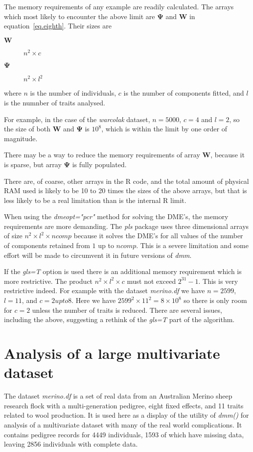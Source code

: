 \documentclass[titlepage]{article}  %
\begin{document}
The memory requirements of any example are readily calculated. The arrays which most likely to encounter the above limit are ${\bm \Psi}$ and ${\bm W}$ in equation~\ref{eq.eighth}. Their sizes are

\begin{description}
\item[${\bm W}$] $n^{2} \times c$
\item[${\bm \Psi}$] $n^{2} \times l^{2}$
\end{description}
 where $n$ is the number of individuals, $c$ is the number of components fitted, and $l$ is the numnber of traits analysed.

For example, in the case of the {\em warcolak} dataset, $n = 5000$, $c = 4$ and $l = 2$, so the size of both ${\bm W}$ and ${\bm \Psi}$ is $10^8$, which is within the limit by one order of magnitude.

There may be a way to reduce the memory requirements of array ${\bm W}$, because it is sparse, but array ${\bm \Psi}$ is fully populated.

There are, of coarse, other arrays in the R code, and the total amount of physical RAM used is likely to be 10 to 20 times the sizes of the above arrays, but that is less likely to be a real limitation than is the internal R limit.

When using the {\em dmeopt="pcr"} method for solving the DME's, the memory requirements are more demanding. The {\em pls} package uses three dimensional arrays of size $n^{2} \times l^{2} \times ncomp$ because it solves the DME's for all values of the number of components retained from $1$ up to $ncomp$. This is a severe limitation and some effort will be made to circumvent it in future versions of {\em dmm}.

If the {\em gls=T} option is used there is an additional memory requirement which is more restrictive. The product $n^{2} \times l^{2} \times c$ must not exceed $2^{31} - 1$. This is very restrictive indeed. For example with the dataset {\em merino.df} we have $n = 2599$, $l = 11$, and $c = 2 upto 8$. Here we have $2599^{2} \times 11^{2} = 8 \times 10^{8}$ so there is only room for $c=2$ unless the number of traits is reduced. There are several issues, including the above,  suggesting a rethink of the {\em gls=T} part of the algorithm.

\clearpage
\section{Analysis of a large multivariate dataset} 
	The dataset {\em merino.df} is a set of real data from an Australian Merino sheep research flock with a multi-generation pedigree, eight fixed effects, and 11 traits related to wool production.
It is used here as a display of the utility of {\em dmm()} for analysis of a multivariate dataset with many of the real world complications. It contains  pedigree records for 4449 individuals, 1593 of which have missing data, leaving 2856 individuals with complete data.
\end{document}
